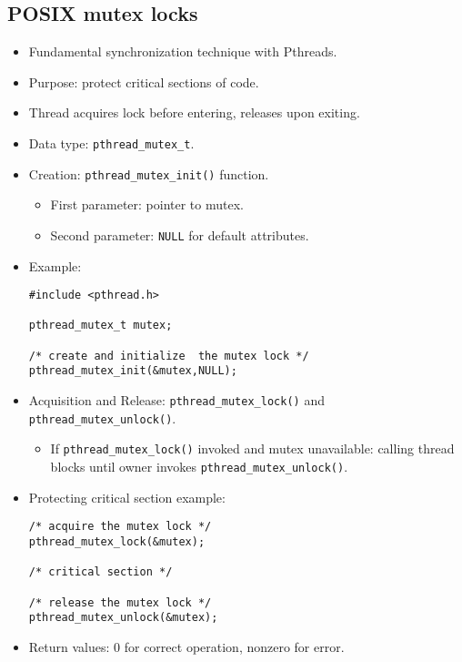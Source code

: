 \subsection{POSIX mutex locks}
\begin{itemize}
    \item Fundamental synchronization technique with Pthreads.
    \item Purpose: protect critical sections of code.
    \item Thread acquires lock before entering, releases upon exiting.
    \item Data type: \texttt{pthread\_mutex\_t}.
    \item Creation: \texttt{pthread\_mutex\_init()} function.
    \begin{itemize}
        \item First parameter: pointer to mutex.
        \item Second parameter: \texttt{NULL} for default attributes.
    \end{itemize}
    \item Example:
    \begin{verbatim}
#include <pthread.h>
 
pthread_mutex_t mutex;
 
/* create and initialize  the mutex lock */
pthread_mutex_init(&mutex,NULL);
    \end{verbatim}
    \item Acquisition and Release: \texttt{pthread\_mutex\_lock()} and \texttt{pthread\_mutex\_unlock()}.
    \begin{itemize}
        \item If \texttt{pthread\_mutex\_lock()} invoked and mutex unavailable: calling thread blocks until owner invokes \texttt{pthread\_mutex\_unlock()}.
    \end{itemize}
    \item Protecting critical section example:
    \begin{verbatim}
/* acquire the mutex lock */
pthread_mutex_lock(&mutex);
 
/* critical section */
 
/* release the mutex lock */
pthread_mutex_unlock(&mutex);
    \end{verbatim}
    \item Return values: 0 for correct operation, nonzero for error.
\end{itemize}

